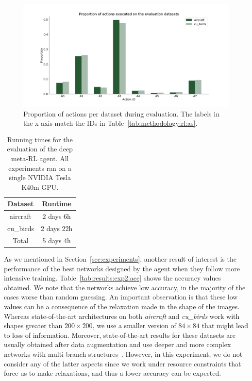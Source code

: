 \begin{figure}[ht]
\centering
    \includegraphics[width=0.85\linewidth]{imgs/chained/actions-dist-evaluation.png}
\caption{Proportion of actions per dataset during evaluation. The labels in the x-axis match the IDs in Table~\ref{tab:methodology:rl:as}.}
\label{fig:results:exp2:actions}
\end{figure}

\begin{table}[ht]
\centering
\begin{tabular}{@{}cc@{}}
\toprule
     Dataset             & Runtime \\ \midrule
aircraft  & 2 days 6h   \\
cu\_birds & 2 days 22h  \\ \midrule
Total                    & 5 days 4h  \\ \bottomrule
\end{tabular}
\caption{Running times for the evaluation of the deep meta-RL agent. All experiments ran on a single NVIDIA Tesla K40m GPU.}
\label{tab:results:exp2:times}
\end{table}


As we mentioned in Section~\ref{sec:experiments}, another result of interest is the performance of the best networks designed by the agent when they follow more intensive training. Table~\ref{tab:results:exp2:acc} shows the accuracy values obtained. We note that the networks achieve low accuracy, in the majority of the cases worse than random guessing. An important observation is that these low values can be a consequence of the relaxation made in the shape of the images. Whereas state-of-the-art architectures on both \textit{aircraft} and \textit{cu\_birds} work with shapes greater than $200 \times 200$, we use a smaller version of $84 \times 84$ that might lead to loss of information. Moreover, state-of-the-art results for these datasets are usually obtained after data augmentation and use deeper and more complex networks with multi-branch structures~\citep{FineGrained2, FineGrained3, FineGrainedResults}. However, in this experiment, we do not consider any of the latter aspects since we work under resource constraints that force us to make relaxations, and thus a lower accuracy can be expected.

